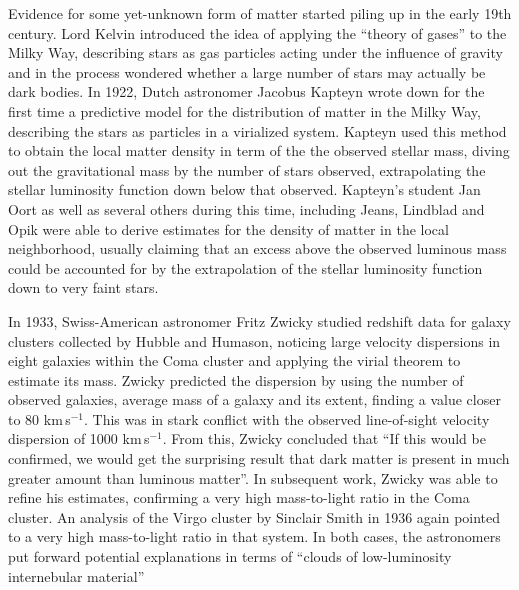 Evidence for some yet-unknown form of matter started piling up in the early 19th century. Lord Kelvin introduced the idea of applying the ``theory of gases'' to the Milky Way, describing stars as gas particles acting under the influence of gravity and in the process wondered whether a large number of stars may actually be dark bodies. In 1922, Dutch astronomer Jacobus Kapteyn wrote down for the first time a predictive model for the distribution of matter in the Milky Way, describing the stars as particles in a virialized system. Kapteyn used this method to obtain the local matter density in term of the the observed stellar mass, diving out the gravitational mass by the number of stars observed, extrapolating the stellar luminosity function down below that observed. Kapteyn's student Jan Oort as well as several others during this time, including Jeans, Lindblad and Opik were able to derive estimates for the density of matter in the local neighborhood, usually claiming that an excess above the observed luminous mass could be accounted for by the extrapolation of the stellar luminosity function down to very faint stars.

In 1933, Swiss-American astronomer Fritz Zwicky studied redshift data for galaxy clusters collected by Hubble and Humason, noticing large velocity dispersions in eight galaxies within the Coma cluster and applying the virial theorem to estimate its mass. Zwicky predicted the dispersion by using the number of observed galaxies, average mass of a galaxy and its extent, finding a value closer to 80 km\,s$^{-1}$. This was in stark conflict with the observed line-of-sight velocity dispersion of 1000 km\,s$^{-1}$. From this, Zwicky concluded that ``If this would be confirmed, we would get the surprising result that dark matter is present in much greater amount than luminous matter''. In subsequent work, Zwicky was able to refine his estimates, confirming a very high mass-to-light ratio in the Coma cluster. An analysis of the Virgo cluster by Sinclair Smith in 1936 again pointed to a very high mass-to-light ratio in that system. In both cases, the astronomers put forward potential explanations in terms of ``clouds of low-luminosity internebular material''

